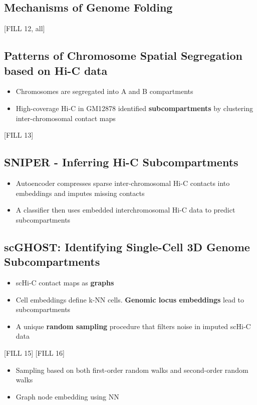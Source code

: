 \documentclass[10pt]{article}
\begin{document}
\subsection*{Mechanisms of Genome Folding}
[FILL 12, all]

\subsection*{Patterns of Chromosome Spatial Segregation based on Hi-C data}
\begin{itemize}
	\item Chromosomes are segregated into A and B compartments
	\item High-coverage Hi-C in GM12878 identified \textbf{subcompartments} by clustering inter-chromosomal contact maps
\end{itemize}
[FILL 13]

\subsection*{SNIPER - Inferring Hi-C Subcompartments}
\begin{itemize}
	\item Autoencoder compresses sparse inter-chromosomal Hi-C contacts into embeddings and imputes missing contacts
	\item A classifier then uses embedded interchromosomal Hi-C data to predict subcompartments
\end{itemize}

\subsection*{scGHOST: Identifying Single-Cell 3D Genome Subcompartments}
\begin{itemize}
	\item scHi-C contact maps as \textbf{graphs}
	\item Cell embeddings define k-NN cells.  \textbf{Genomic locus embeddings} lead to subcompartments
	\item A unique \textbf{random sampling} procedure that filters noise in imputed scHi-C data
\end{itemize}
[FILL 15]
[FILL 16]
\begin{itemize}
	\item Sampling based on both first-order random walks and second-order random walks
	\item Graph node embedding using NN
\end{itemize}
\end{document}
